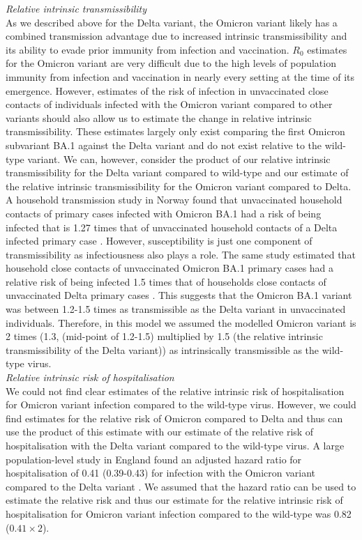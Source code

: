 \textit{Relative intrinsic transmissibility}\\
As we described above for the Delta variant, the Omicron variant likely has a combined transmission advantage due to increased intrinsic transmissibility and its ability to evade prior immunity from infection and vaccination. 
$R_0$ estimates for the Omicron variant are very difficult due to the high levels of population immunity from infection and vaccination in nearly every setting at the time of its emergence. 
However, estimates of the risk of infection in unvaccinated close contacts of individuals infected with the Omicron variant compared to other variants should 
also allow us to estimate the change in relative intrinsic transmissibility. These estimates largely only exist comparing the first Omicron subvariant BA.1 
against the Delta variant and do not exist relative to the wild-type variant. 
We can, however, consider the product of our relative intrinsic transmissibility for the Delta variant compared to wild-type and our estimate of the relative 
intrinsic transmissibility for the Omicron variant compared to Delta. A household transmission study in Norway found that unvaccinated household contacts of 
primary cases infected with Omicron BA.1 had a risk of being infected that is 1.27 times that of unvaccinated household contacts of a Delta infected primary 
case \cite{jalili2022}. However, susceptibility is just one component of transmissibility as infectiousness also plays a role. 
The same study estimated that household close contacts of unvaccinated Omicron BA.1 primary cases had a relative risk of being infected 1.5 times that of 
households close contacts of unvaccinated Delta primary cases \cite{jalili2022}. This suggests that the Omicron BA.1 variant was between 1.2-1.5 times as 
transmissible as the Delta variant in unvaccinated individuals. Therefore, in this model we assumed the modelled Omicron variant is 2 times 
(1.3, (mid-point of 1.2-1.5) multiplied by 1.5 (the relative intrinsic transmissibility of the Delta variant)) as intrinsically transmissible as the wild-type virus.\\

\textit{Relative intrinsic risk of hospitalisation}\\
We could not find clear estimates of the relative intrinsic risk of hospitalisation for Omicron variant infection compared to the wild-type virus. However, we could find estimates 
for the relative risk of Omicron compared to Delta and thus can use the product of this estimate with our estimate of the relative risk of hospitalisation 
with the Delta variant compared to the wild-type virus. A large population-level study in England found an adjusted hazard ratio for hospitalisation of 0.41 (0.39-0.43) for infection 
with the Omicron variant compared to the Delta variant \cite{nyberg2022}. We assumed that the hazard ratio can be used to estimate the relative risk and thus our 
estimate for the relative intrinsic risk of hospitalisation for Omicron variant infection compared to the wild-type was 0.82 ($0.41\times2$).\\

